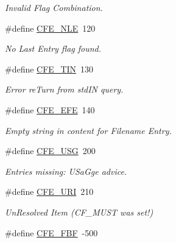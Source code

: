 \begin{DoxyCompactItemize}
\begin{DoxyCompactList}\small\item\em Invalid Flag Combination. \end{DoxyCompactList}\item 
\hypertarget{group__errors_ga92aa7a17d2248b62f428d9e655f7d35e}{\#define \hyperlink{group__errors_ga92aa7a17d2248b62f428d9e655f7d35e}{C\-F\-E\-\_\-\-N\-L\-E}~120}\label{group__errors_ga92aa7a17d2248b62f428d9e655f7d35e}

\begin{DoxyCompactList}\small\item\em No Last Entry flag found. \end{DoxyCompactList}\item 
\hypertarget{group__errors_ga3e780bea24126b1d0750f3ee7a96b8a8}{\#define \hyperlink{group__errors_ga3e780bea24126b1d0750f3ee7a96b8a8}{C\-F\-E\-\_\-\-T\-I\-N}~130}\label{group__errors_ga3e780bea24126b1d0750f3ee7a96b8a8}

\begin{DoxyCompactList}\small\item\em Error re\-Turn from std\-I\-N query. \end{DoxyCompactList}\item 
\hypertarget{group__errors_ga9e2ead53d32b9cf9f0e280a452c8e2e6}{\#define \hyperlink{group__errors_ga9e2ead53d32b9cf9f0e280a452c8e2e6}{C\-F\-E\-\_\-\-E\-F\-E}~140}\label{group__errors_ga9e2ead53d32b9cf9f0e280a452c8e2e6}

\begin{DoxyCompactList}\small\item\em Empty string in content for Filename Entry. \end{DoxyCompactList}\item 
\hypertarget{group__errors_gaee86803a95d7d53a01c86f98c231aa7c}{\#define \hyperlink{group__errors_gaee86803a95d7d53a01c86f98c231aa7c}{C\-F\-E\-\_\-\-U\-S\-G}~200}\label{group__errors_gaee86803a95d7d53a01c86f98c231aa7c}

\begin{DoxyCompactList}\small\item\em Entries missing\-: U\-Sa\-Gge advice. \end{DoxyCompactList}\item 
\hypertarget{group__errors_gad9ced7e6eab277e4e24f511af9daf3bf}{\#define \hyperlink{group__errors_gad9ced7e6eab277e4e24f511af9daf3bf}{C\-F\-E\-\_\-\-U\-R\-I}~210}\label{group__errors_gad9ced7e6eab277e4e24f511af9daf3bf}

\begin{DoxyCompactList}\small\item\em Un\-Resolved Item (C\-F\-\_\-\-M\-U\-S\-T was set!) \end{DoxyCompactList}\item 
\hypertarget{group__errors_ga22ceafacdf80ae7247728f05c9129b1e}{\#define \hyperlink{group__errors_ga22ceafacdf80ae7247728f05c9129b1e}{C\-F\-E\-\_\-\-F\-B\-F}~-\/500}\label{group__errors_ga22ceafacdf80ae7247728f05c9129b1e}


\end{DoxyCompactItemize}
